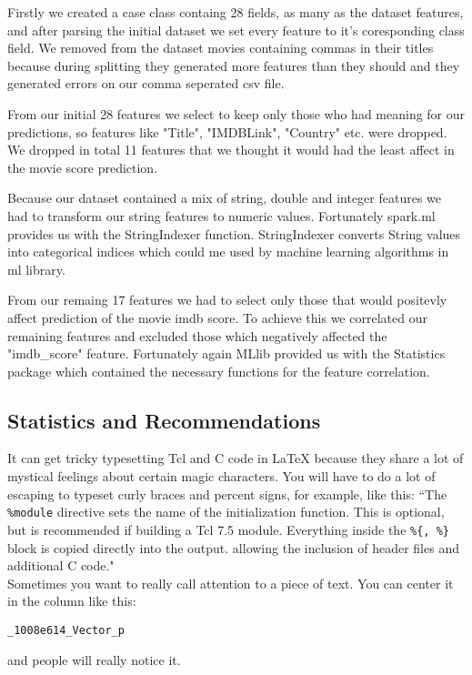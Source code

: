 \documentclass[letterpaper,twocolumn,10pt]{article}
\begin{document}
Firstly we created a case class containg 28 fields, as many as the dataset features, and after parsing the initial dataset we set every feature to it's coresponding class field. We removed from the dataset movies containing commas in their titles because during splitting they generated more features than they should and they generated errors on our comma seperated csv file.\par 

From our initial 28 features we select to keep only those who had meaning for our predictions, so features like "Title", "IMDBLink", "Country" etc. were dropped. We dropped in total 11 features that we thought it would had the least affect in the movie score prediction. \par 

Because our dataset contained a mix of string, double and integer features we had to transform our string features to numeric values. Fortunately spark.ml provides us with the StringIndexer function. StringIndexer converts String values into categorical indices which could me used by machine learning algorithms in ml library.\par 

From our remaing 17 features we had to select only those that would positevly affect prediction of the movie imdb score. To achieve this we correlated our remaining features and excluded those which negatively affected the "imdb\_score" feature. Fortunately again MLlib provided us with the Statistics package which contained the necessary functions for the feature correlation.\par 


\subsection{Statistics and Recommendations}

It can get tricky typesetting Tcl and C code in LaTeX because they share
a lot of mystical feelings about certain magic characters.  You
will have to do a lot of escaping to typeset curly braces and percent
signs, for example, like this:
``The {\tt \%module} directive
sets the name of the initialization function.  This is optional, but is
recommended if building a Tcl 7.5 module.
Everything inside the {\tt \%\{, \%\}}
block is copied directly into the output. allowing the inclusion of
header files and additional C code." \\

Sometimes you want to really call attention to a piece of text.  You
can center it in the column like this:
\begin{center}
{\tt \_1008e614\_Vector\_p}
\end{center}
and people will really notice it.\\
\end{document}
